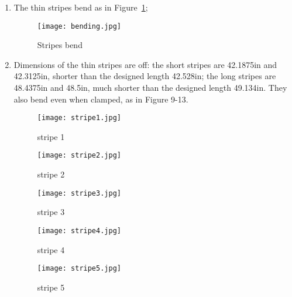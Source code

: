 \documentclass[12pt]{article}
\theoremstyle{definition}
\begin{document}
\begin{enumerate}
  \item The thin stripes bend as in Figure~\ref{bending};

  \begin{figure}[!ht]
    \centering
    \texttt{[image: bending.jpg]}
    \caption{Stripes bend}
    \label{bending}
  \end{figure}

  \item Dimensions of the thin stripes are off: the short stripes are 42.1875in and 42.3125in, shorter than the designed length 42.528in; the long stripes are 48.4375in and 48.5in, much shorter than the designed length 49.134in. They also bend even when clamped, as in Figure 9-13.
  \begin{figure}[!ht]
    \centering
       \texttt{[image: stripe1.jpg]}
       \label{stripe1}
       \caption{stripe 1}
  \end{figure}
  \begin{figure}[!ht]
    \centering
       \texttt{[image: stripe2.jpg]}
       \label{stripe2}
       \caption{stripe 2}
  \end{figure}
     \begin{figure}
       \centering
       \texttt{[image: stripe3.jpg]}
       \label{stripe3}
       \caption{stripe 3}
     \end{figure}
     \begin{figure}
       \centering
       \texttt{[image: stripe4.jpg]}
       \label{stripe4}
       \caption{stripe 4}
     \end{figure}
     \begin{figure}
       \centering
       \texttt{[image: stripe5.jpg]}
       \label{stripe5}
       \caption{stripe 5}
     \end{figure}
\end{enumerate}
\end{document}
